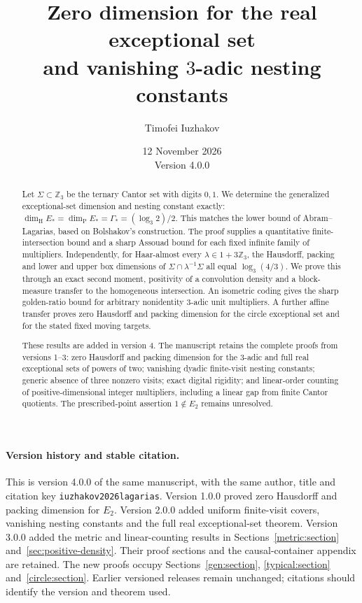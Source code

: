 \documentclass[11pt]{article}
\title{Zero dimension for the real exceptional set\protect\\
and vanishing $3$-adic nesting constants}
\author{Timofei Iuzhakov}
\date{12 November 2026\\Version 4.0.0}
\theoremstyle{definition}
\theoremstyle{remark}
\newcommand{\Z}{\mathbb Z}
\newcommand{\dimH}{\dim_{\mathrm H}}
\newcommand{\dimP}{\dim_{\mathrm P}}
\begin{document}
\maketitle
\begin{abstract}
Let $\Sigma\subset\Z_3$ be the ternary Cantor set with digits $0,1$.
We determine the generalized exceptional-set dimension and nesting
constant exactly: $\dimH E_*=\dimP E_*=\Gamma_*=(\log_3 2)/2$.
This matches the lower bound of Abram--Lagarias, based on Bolshakov's
construction. The proof supplies a quantitative finite-intersection
bound and a sharp Assouad bound for each fixed infinite family of
multipliers. Independently, for Haar-almost every
$\lambda\in1+3\Z_3$, the Hausdorff, packing and lower and upper box
dimensions of $\Sigma\cap\lambda^{-1}\Sigma$ all equal
$\log_3(4/3)$. We prove this through an exact second moment,
positivity of a convolution density and a block-measure transfer to
the homogeneous intersection. An isometric coding gives the sharp
golden-ratio bound for arbitrary nonidentity $3$-adic unit multipliers.
A further affine transfer proves zero Hausdorff and packing dimension
for the circle exceptional set and for the stated fixed moving targets.

These results are added in version 4. The manuscript retains the
complete proofs from versions 1--3: zero Hausdorff and packing
dimension for the $3$-adic and full real exceptional sets of powers of
two; vanishing dyadic finite-visit nesting constants; generic absence
of three nonzero visits; exact digital rigidity; and linear-order
counting of positive-dimensional integer multipliers, including a
linear gap from finite Cantor quotients. The prescribed-point assertion
$1\notin E_2$ remains unresolved.
\end{abstract}

\paragraph{Version history and stable citation.}
This is version 4.0.0 of the same manuscript, with the same author,
title and citation key \texttt{iuzhakov2026lagarias}.
Version 1.0.0 proved zero Hausdorff and packing dimension for $E_2$.
Version 2.0.0 added uniform finite-visit covers, vanishing nesting
constants and the full real exceptional-set theorem.
Version 3.0.0 added the metric and linear-counting results in
Sections~\ref{metric:section} and~\ref{sec:positive-density}.
Their proof sections and the causal-container appendix are retained.
The new proofs occupy Sections~\ref{gen:section},
\ref{typical:section} and~\ref{circle:section}.
Earlier versioned releases remain unchanged; citations should identify
the version and theorem used.
\end{document}
